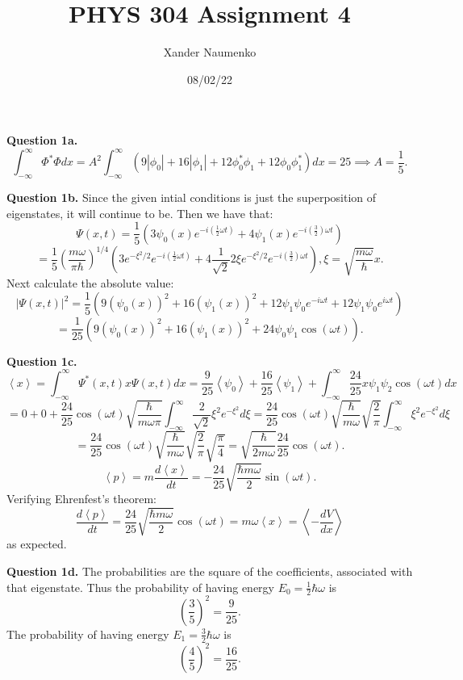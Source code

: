 \documentclass[letterpaper, reqno,11pt]{article}
\begin{document}
\title{PHYS 304 Assignment 4}
\date{08/02/22}
\author{Xander Naumenko}
\maketitle

{\noindent\bf Question 1a.} 
\[
\int_{-\infty}^{\infty}\Phi^*\Phi dx=A^2\int_{-\infty}^{\infty}\left( 9|\phi_0|+16|\phi_1|+12\phi_0^*\phi_1+12\phi_0\phi_1^* \right) dx=25\implies A=\frac{1}{5}
.\]

{\noindent\bf Question 1b.} Since the given intial conditions is just the superposition of eigenstates, it will continue to be. Then we have that: 
\[
\Psi(x, t)=\frac{1}{5}(3\psi_0(x)e^{-i(\frac{1}{2}\omega t)}+4\psi_1(x)e^{-i(\frac{3}{2})\omega t})
\]
\[
=\frac{1}{5}\left( \frac{m\omega}{\pi \hbar} \right)^{1 /4}(3e^{-\xi^2 /2}e^{-i(\frac{1}{2}\omega t)}+4\frac{1}{\sqrt{2} }2\xi e^{-\xi^2 /2}e^{-i(\frac{3}{2})\omega t}), \xi=\sqrt{\frac{m\omega}{\hbar}} x
.\]
Next calculate the absolute value: 
\[
|\Psi(x, t)|^2=\frac{1}{5}\left( 9(\psi_0(x))^2+16(\psi_1(x))^2+12\psi_1\psi_0 e^{-i\omega t}+12\psi_1\psi_0 e^{i\omega t} \right) 
\]
\[
=\frac{1}{25}\left( 9(\psi_0(x))^2+16(\psi_1(x))^2+24\psi_0\psi_1\cos(\omega t) \right)
.\]

{\noindent\bf Question 1c.} 
\[
\left<x \right>=\int_{-\infty}^{\infty}\Psi^{*}(x, t)x\Psi(x, t)dx=\frac{9}{25}\left<\psi_0 \right>+\frac{16}{25}\left<\psi_1 \right>+\int_{-\infty}^{\infty}\frac{24}{25}x\psi_1\psi_2\cos(\omega t)dx
\]
\[
=0+0+\frac{24}{25}\cos(\omega t)\sqrt{\frac{\hbar}{m\omega\pi}} \int_{-\infty}^{\infty}\frac{2}{\sqrt{2} }\xi^2 e^{-\xi^2}d\xi=\frac{24}{25}\cos(\omega t)\sqrt{\frac{\hbar}{m\omega}}\sqrt{\frac{2}{\pi}} \int_{-\infty}^{\infty}\xi^2 e^{-\xi^2}d\xi
\]
\[
=\frac{24}{25}\cos(\omega t)\sqrt{\frac{\hbar}{m\omega}}\sqrt{\frac{2}{\pi}}\sqrt{\frac{\pi}{4}} =\sqrt{\frac{\hbar}{2m\omega}}\frac{24}{25}\cos(\omega t)
.\]
\[
\left<p \right>=m\frac{d\left<x \right>}{dt}=-\frac{24}{25}\sqrt{\frac{\hbar m\omega}{2}}\sin(\omega t)
.\]
Verifying Ehrenfest's theorem: 
\[
\frac{d\left<p \right>}{dt}=\frac{24}{25}\sqrt{\frac{\hbar m\omega}{2}}\cos(\omega t)=m\omega \left<x \right>=\left<-\frac{dV}{dx} \right>
\]
as expected. 

{\noindent\bf Question 1d.} The probabilities are the square of the coefficients, associated with that eigenstate. Thus the probability of having energy $ E_0=\frac{1}{2}\hbar\omega$ is 
\[
    (\frac{3}{5})^2=\frac{9}{25}
.\]
The probability of having energy $ E_1=\frac{3}{2}\hbar\omega$ is 
\[
    (\frac{4}{5})^2=\frac{16}{25}
.\]
\end{document}
